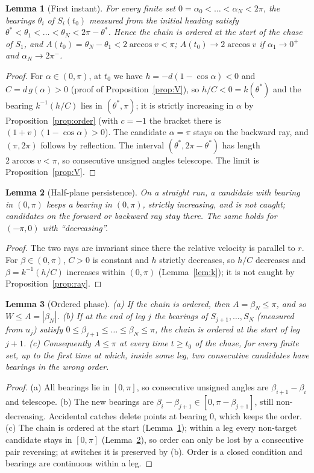 \documentclass[11pt]{article}
\newtheorem{lemma}{Lemma}
\theoremstyle{remark}\newtheorem{remark}{Remark}
\begin{document}
\begin{lemma}[First instant]\label{lem:A1}
For every finite set $0=\alpha_0<\dots<\alpha_N<2\pi$, the bearings $\theta_i$ of $S_i(t_0)$ measured from the initial heading satisfy
$\theta^*<\theta_1<\dots<\theta_N<2\pi-\theta^*$. Hence the chain is ordered at the start of the chase of $S_1$, and
$A(t_0)=\theta_N-\theta_1<2\arccos v<\pi$; $A(t_0)\to2\arccos v$ if $\alpha_1\to0^+$ and $\alpha_N\to2\pi^-$.
\end{lemma}
\begin{proof}
For $\alpha\in(0,\pi)$, at $t_0$ we have $h=-d(1-\cos\alpha)<0$ and $C=d\,g(\alpha)>0$ (proof of Proposition~\ref{prop:V}), so
$h/C<0=k(\theta^*)$ and the bearing $k^{-1}(h/C)$ lies in $(\theta^*,\pi)$; it is strictly increasing in $\alpha$ by
Proposition~\ref{prop:order} (with $c=-1$ the bracket there is $(1+v)(1-\cos\alpha)>0$). The candidate $\alpha=\pi$ stays on the
backward ray, and $(\pi,2\pi)$ follows by reflection. The interval $(\theta^*,2\pi-\theta^*)$ has length $2\arccos v<\pi$, so
consecutive unsigned angles telescope. The limit is Proposition~\ref{prop:V}.
\end{proof}

\begin{lemma}[Half-plane persistence]\label{lem:A2}
On a straight run, a candidate with bearing in $(0,\pi)$ keeps a bearing in $(0,\pi)$, strictly increasing, and is not caught;
candidates on the forward or backward ray stay there. The same holds for $(-\pi,0)$ with ``decreasing''.
\end{lemma}
\begin{proof}
The two rays are invariant since there the relative velocity is parallel to $r$. For $\beta\in(0,\pi)$, $C>0$ is constant and $h$
strictly decreases, so $h/C$ decreases and $\beta=k^{-1}(h/C)$ increases within $(0,\pi)$ (Lemma~\ref{lem:k}); it is not caught by
Proposition~\ref{prop:ray}.
\end{proof}

\begin{lemma}[Ordered phase]\label{lem:A3}
(a) If the chain is ordered, then $A=\beta_N\le\pi$, and so $W\le A=|\beta_N|$.
(b) If at the end of leg $j$ the bearings of $S_{j+1},\dots,S_N$ (measured from $u_j$) satisfy $0\le\beta_{j+1}\le\dots\le\beta_N\le\pi$, the
chain is ordered at the start of leg $j+1$.
(c) Consequently $A\le\pi$ at every time $t\ge t_0$ of the chase, for every finite set, up to the first time at which, inside some leg,
two consecutive candidates have bearings in the wrong order.
\end{lemma}
\begin{proof}
(a) All bearings lie in $[0,\pi]$, so consecutive unsigned angles are $\beta_{i+1}-\beta_i$ and telescope. (b) The new bearings are
$\beta_i-\beta_{j+1}\in[0,\pi-\beta_{j+1}]$, still non-decreasing. Accidental catches delete points at bearing $0$, which keeps the order.
(c) The chain is ordered at the start (Lemma~\ref{lem:A1}); within a leg every non-target candidate stays in $[0,\pi]$
(Lemma~\ref{lem:A2}), so order can only be lost by a consecutive pair reversing; at switches it is preserved by (b). Order is a
closed condition and bearings are continuous within a leg.
\end{proof}
\end{document}
